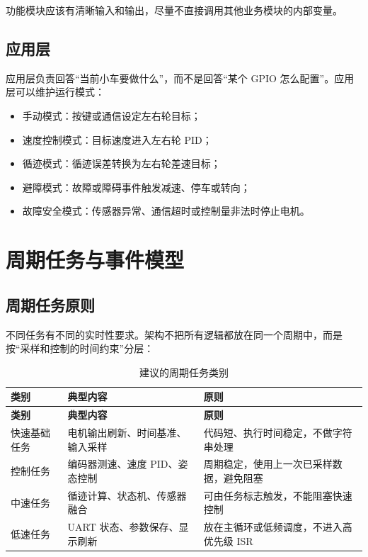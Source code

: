 \documentclass[11pt,a4paper,fontset=fandol]{ctexart}
\begin{document}
功能模块应该有清晰输入和输出，尽量不直接调用其他业务模块的内部变量。

\subsection{应用层}

应用层负责回答“当前小车要做什么”，而不是回答“某个 GPIO 怎么配置”。应用层可以维护运行模式：

\begin{itemize}
\item 手动模式：按键或通信设定左右轮目标；
\item 速度控制模式：目标速度进入左右轮 PID；
\item 循迹模式：循迹误差转换为左右轮差速目标；
\item 避障模式：故障或障碍事件触发减速、停车或转向；
\item 故障安全模式：传感器异常、通信超时或控制量非法时停止电机。
\end{itemize}

\section{周期任务与事件模型}

\subsection{周期任务原则}

不同任务有不同的实时性要求。架构不把所有逻辑都放在同一个周期中，而是按“采样和控制的时间约束”分层：

\begin{longtable}{p{}p{}p{}}
\caption{建议的周期任务类别}\\
\toprule
\textbf{类别} & \textbf{典型内容} & \textbf{原则}\\
\midrule
\endfirsthead
\toprule
\textbf{类别} & \textbf{典型内容} & \textbf{原则}\\
\midrule
\endhead
快速基础任务 & 电机输出刷新、时间基准、输入采样 & 代码短、执行时间稳定，不做字符串处理\\
控制任务 & 编码器测速、速度 PID、姿态控制 & 周期稳定，使用上一次已采样数据，避免阻塞\\
中速任务 & 循迹计算、状态机、传感器融合 & 可由任务标志触发，不能阻塞快速控制\\
低速任务 & UART 状态、参数保存、显示刷新 & 放在主循环或低频调度，不进入高优先级 ISR\\
\bottomrule
\end{longtable}
\end{document}
